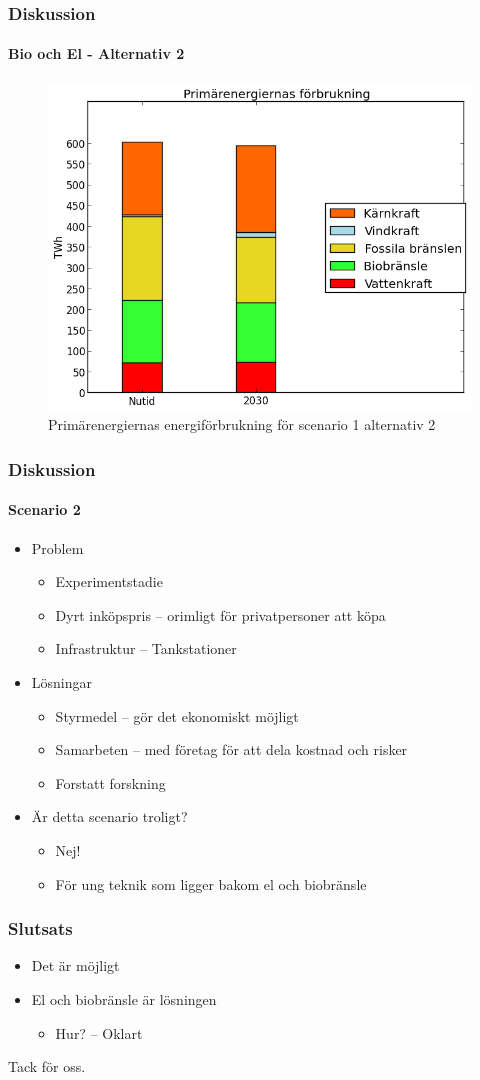 \documentclass{beamer}
\begin{document}
\begin{frame}
	\frametitle{Diskussion}
	\framesubtitle{Bio och El - Alternativ 2}
	\begin{figure}[h!]
       \centering
       \includegraphics[scale=0.5]{scen1a2energidiagram.png}
       \caption{Primärenergiernas energiförbrukning för scenario 1 alternativ 2}
       \label{fig:scen1a1energidiagram}
	\end{figure}
\end{frame}

\begin{frame}
	\frametitle{Diskussion}
	\framesubtitle{Scenario 2}
	\begin{itemize}
		\item Problem
			\begin{itemize}
				\item Experimentstadie
				\item Dyrt inköpspris -- orimligt för privatpersoner att köpa
				\item Infrastruktur -- Tankstationer
			\end{itemize}
		\pause
		\item Lösningar
			\begin{itemize}
				\item Styrmedel -- gör det ekonomiskt möjligt
				\item Samarbeten -- med företag för att dela kostnad och risker
				\item Forstatt forskning
			\end{itemize}
		\pause
		\item Är detta scenario troligt?
			\begin{itemize}
				\item Nej!
				\item För ung teknik som ligger bakom el och biobränsle
			\end{itemize}
	\end{itemize}
\end{frame}

\begin{frame}
	\frametitle{Slutsats}
	\begin{itemize}
		\item Det är möjligt
		\item El och biobränsle är lösningen
			\begin{itemize}
				\item Hur? -- Oklart
			\end{itemize}
	\end{itemize}
	\vfill
	Tack för oss.
\end{frame}
\end{document}
